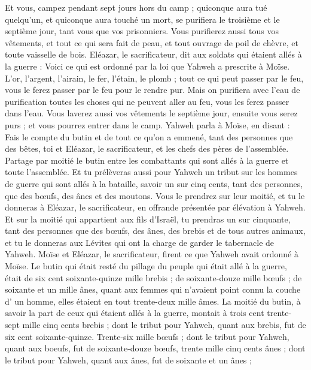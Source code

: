 \begin{multicols}{2}
Et vous, campez pendant sept jours hors du camp ; quiconque aura tué quelqu'un, et quiconque aura touché un mort, se purifiera le troisième et le septième jour, tant vous que vos prisonniers.
Vous purifierez aussi tous vos vêtements, et tout ce qui sera fait de peau, et tout ouvrage de poil de chèvre, et toute vaisselle de bois.
Eléazar, le sacrificateur, dit aux soldats qui étaient allés à la guerre : Voici ce qui est ordonné par la loi que Yahweh a prescrite à Moïse.
L'or, l'argent, l'airain, le fer, l'étain, le plomb ;
tout ce qui peut passer par le feu, vous le ferez passer par le feu pour le rendre pur. Mais on purifiera avec l'eau de purification toutes les choses qui ne peuvent aller au feu, vous les ferez passer dans l’eau.
Vous laverez aussi vos vêtements le septième jour, ensuite vous serez purs ; et vous pourrez entrer dans le camp.
Yahweh parla à Moïse, en disant :
Fais le compte du butin et de tout ce qu'on a emmené, tant des personnes que des bêtes, toi et Eléazar, le sacrificateur, et les chefs des pères de l'assemblée.
Partage par moitié le butin entre les combattants qui sont allés à la guerre et toute l'assemblée.
Et tu prélèveras aussi pour Yahweh un tribut sur les hommes de guerre qui sont allés à la bataille, savoir un sur cinq cents, tant des personnes, que des bœufs, des ânes et des moutons.
Vous le prendrez sur leur moitié, et tu le donneras à Eléazar, le sacrificateur, en offrande présentée par élévation à Yahweh.
Et sur la moitié qui appartient aux fils d'Israël, tu prendras un sur cinquante, tant des personnes que des bœufs, des ânes, des brebis et de tous autres animaux, et tu le donneras aux Lévites qui ont la charge de garder le tabernacle de Yahweh.
Moïse et Eléazar, le sacrificateur, firent ce que Yahweh avait ordonné à Moïse.
Le butin qui était resté du pillage du peuple qui était allé à la guerre, était de six cent soixante-quinze mille brebis ;
de soixante-douze mille bœufs ;
de soixante et un mille ânes,
quant aux femmes qui n'avaient point connu la couche d' un homme, elles étaient en tout trente-deux mille âmes.
La moitié du butin, à savoir la part de ceux qui étaient allés à la guerre, montait à trois cent trente-sept mille cinq cents brebis ;
dont le tribut pour Yahweh, quant aux brebis, fut de six cent soixante-quinze.
Trente-six mille bœufs ; dont le tribut pour Yahweh, quant aux boeufs, fut de soixante-douze bœufs,
trente mille cinq cents ânes ; dont le tribut pour Yahweh, quant aux ânes, fut de soixante et un ânes ;

\end{multicols}
